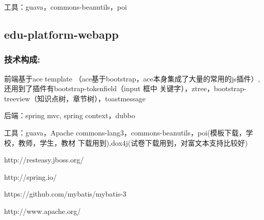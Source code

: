 \documentclass[UTF8]{ctexart}
\begin{document}
工具：guava，commons-beanutils，poi


\subsection{edu-platform-webapp}

\subsubsection{技术构成:}
前端基于ace template （ace基于bootstrap，ace本身集成了大量的常用的js插件）,还用到了插件有bootstrap-tokenfield（input 框中 关键字），ztree，bootstrap-treeview（知识点树，章节树），toastmessage

后端：spring mvc, spring context，dubbo

工具：guava，Apache commons-lang3，commons-beanutils，poi(模板下载，学校，教师，学生，教材 下载用到),dox4j(试卷下载用到，对富文本支持比较好)

\begin{thebibliography}{1}

\bibitem{}
\newblock http://resteasy.jboss.org/

\bibitem{}
\newblock http://spring.io/

\bibitem{}
\newblock https://github.com/mybatis/mybatis-3

\bibitem{}
\newblock http://www.apache.org/

\end{thebibliography}
\end{document}
